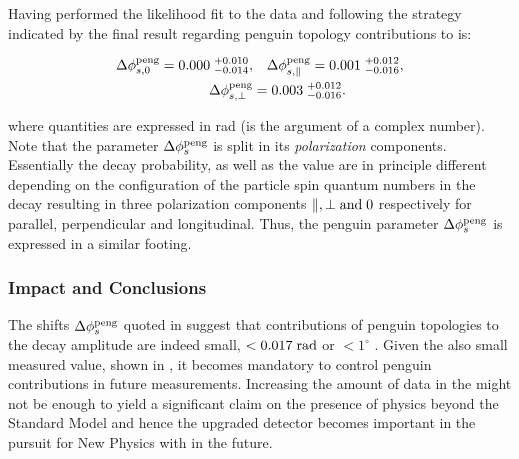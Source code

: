 Having performed the likelihood fit to the data and
following the strategy indicated by \cite{Fleischer:1999zi,Faller:2008gt,DeBruyn:2014oga,DeBruyn-thesis}
the final result regarding penguin topology contributions to \phis is:


\begin{align}
\label{app_delta_phis_result}
  \Delta\phi^{\rm peng}_{s,{0}}         = 0.000 \; ^{+0.010}_{-0.014}, &\quad  \Delta\phi^{\rm peng}_{s,{\parallel}} = 0.001 \; ^{+0.012}_{-0.016}, \nonumber \\
  \Delta\phi^{\rm peng}_{s,{\perp}}     &= 0.003 \; ^{+0.012}_{-0.016}.
\end{align}

\noindent where quantities are expressed in rad (\phis is the argument of a complex number).
Note that the parameter $\Delta\phi_{s}^{\tiny\text{peng}}$ is split in its {\it polarization}
components. Essentially the \BsJpsiPhi decay probability, as well as the \phis value
are in principle different depending on the configuration of the particle spin
quantum numbers in the \BsJpsiPhi decay resulting in three polarization components
$\parallel,\perp {\rm and}\; 0$ respectively for parallel, perpendicular and longitudinal.
Thus, the penguin parameter $\Delta\phi_{s}^{\tiny\text{peng}}$ is expressed in a similar footing.


\subsubsection{Impact and Conclusions}

The shifts $\Delta\phi_{s}^{\tiny\text{peng}}$ quoted in 
suggest that contributions of penguin topologies to the \BsJpsiPhi decay amplitude are indeed small,
$<0.017 \; {\rm rad}$ or $<1^\circ$ . Given the also small \phis measured value, shown in ,
it becomes mandatory to control penguin contributions in future \phis measurements.
Increasing the amount of data in the \lhc \runtwo might not be enough to yield
a significant claim on the presence of physics beyond the Standard Model and hence
the upgraded \lhcb detector becomes important in the pursuit for New Physics with
\phis in the future.

%
%
%
